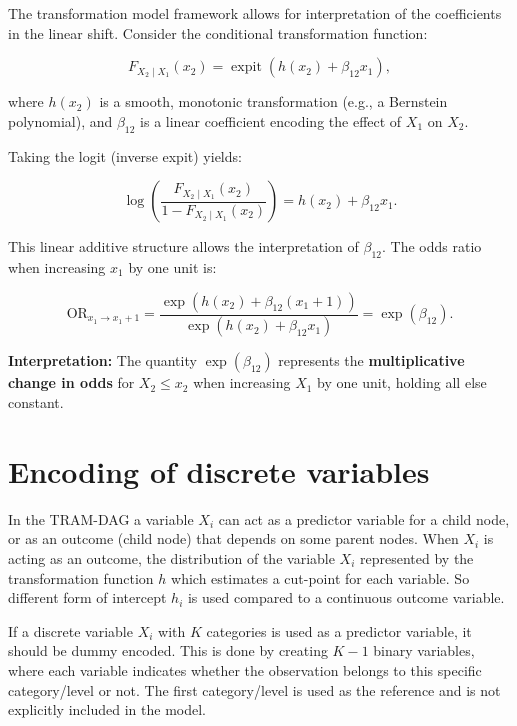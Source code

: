 The transformation model framework allows for interpretation of the coefficients in the linear shift. Consider the conditional transformation function:

\begin{equation}
F_{X_2 \mid X_1}(x_2) = \operatorname{expit}( h(x_2) + \beta_{12} x_1 ),
\end{equation}

where \( h(x_2) \) is a smooth, monotonic transformation (e.g., a Bernstein polynomial), and \( \beta_{12} \) is a linear coefficient encoding the effect of \( X_1 \) on \( X_2 \).

Taking the logit (inverse expit) yields:

\begin{equation}
\log\left( \frac{F_{X_2 \mid X_1}(x_2)}{1 - F_{X_2 \mid X_1}(x_2)} \right)
= h(x_2) + \beta_{12} x_1.
\end{equation}

This linear additive structure allows the interpretation of \( \beta_{12} \). The odds ratio when increasing \( x_1 \) by one unit is:

\begin{equation}
\text{OR}_{x_1 \to x_1 + 1} = 
\frac{\exp(h(x_2) + \beta_{12}(x_1 + 1))}{\exp(h(x_2) + \beta_{12} x_1)} 
= \exp(\beta_{12}).
\end{equation}

\noindent\textbf{Interpretation:} The quantity \( \exp(\beta_{12}) \) represents the \textbf{multiplicative change in odds} for \( X_2 \le x_2 \) when increasing \( X_1 \) by one unit, holding all else constant.



\section{Encoding of discrete variables} \label{sec:encoding_discrete_variables}

In the TRAM-DAG a variable $X_i$ can act as a predictor variable for a child node, or as an outcome (child node) that depends on some parent nodes. When $X_i$ is acting as an outcome, the distribution of the variable $X_i$ represented by the transformation function $h$ which estimates a cut-point for each variable. So different form of intercept $h_i$ is used compared to a continuous outcome variable.

If a discrete variable $X_i$ with $K$ categories is used as a predictor variable, it should be dummy encoded. This is done by creating $K-1$ binary variables, where each variable indicates whether the observation belongs to this specific category/level or not. The first category/level is used as the reference and is not explicitly included in the model.

